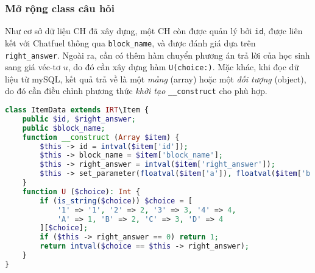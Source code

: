 \subsubsection{Mở rộng class câu hỏi}
Như cơ sở dữ liệu CH đã xây dựng, một CH còn được quản lý bởi \texttt{id}, được liên kết với Chatfuel thông qua \texttt{block\_name}, và được đánh giá dựa trên \texttt{right\_answer}. Ngoài ra, cần có thêm hàm chuyển phương án trả lời của học sinh sang giá véc-tơ $u$, do đó cần xây dựng hàm \texttt{U(choice:)}. Mặc khác, khi đọc dữ liệu từ mySQL, kết quả trả về là một \textit{mảng} (array) hoặc một \textit{đối tượng} (object), do đó cần điều chỉnh phương thức \textit{khởi tạo} \texttt{\_\_construct} cho phù hợp.
\begin{lstlisting}[language=php,caption=Class câu hỏi được mở rộng]
class ItemData extends IRT\Item {
	public $id, $right_answer;
	public $block_name;
	function __construct (Array $item) {
		$this -> id = intval($item['id']);
		$this -> block_name = $item['block_name'];
		$this -> right_answer = intval($item['right_answer']);
		$this -> set_parameter(floatval($item['a']), floatval($item['b']));
	}
	function U ($choice): Int {
		if (is_string($choice)) $choice = [
			'1' => '1', '2' => 2, '3' => 3, '4' => 4,
			'A' => 1, 'B' => 2, 'C' => 3, 'D' => 4
		][$choice];
		if ($this -> right_answer == 0) return 1;
		return intval($choice == $this -> right_answer);
	}
}
\end{lstlisting}

